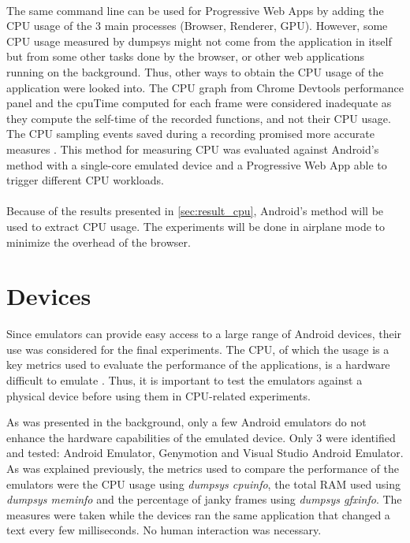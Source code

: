 \documentclass{kththesis}
\begin{document}
\paragraph{}
The same command line can be used for Progressive Web Apps by adding the CPU usage of the 3 main processes (Browser, Renderer, GPU). 
However, some CPU usage measured by dumpsys might not come from the application in itself but from some other tasks done by the browser, or other web applications running on the background. 
Thus, other ways to obtain the CPU usage of the application were looked into.
The CPU graph from Chrome Devtools performance panel and the cpuTime computed for each frame were considered inadequate as they compute the self-time of the recorded functions, and not their CPU usage. The CPU sampling events saved during a recording promised more accurate measures \cite{cpu_sampling}. This method for measuring CPU was evaluated against Android's method with a single-core emulated device and a Progressive Web App able to trigger different CPU workloads. \newline

\paragraph{}
Because of the results presented in \autoref{sec:result_cpu}, Android's method will be used to extract CPU usage. The experiments will be done in airplane mode to minimize the overhead of the browser. 




\section{Devices}
\label{method:emulators}

Since emulators can provide easy access to a large range of Android devices, their use was considered for the final experiments. The CPU, of which the usage is a key metrics used to evaluate the performance of the applications, is a hardware difficult to emulate \cite{cpu_emulator}. Thus, it is important to test the emulators against a physical device before using them in CPU-related experiments.

As was presented in the background, only a few Android emulators do not enhance the hardware capabilities of the emulated device. Only 3 were identified and tested: Android Emulator, Genymotion and Visual Studio Android Emulator. As was explained previously, the metrics used to compare the performance of the emulators were the CPU usage using \textit{dumpsys cpuinfo}, the total RAM used using \textit{dumpsys meminfo} and the percentage of janky frames using \textit{dumpsys gfxinfo}. The measures were taken while the devices ran the same application that changed a text every few milliseconds. No human interaction was necessary. \newline
\end{document}
